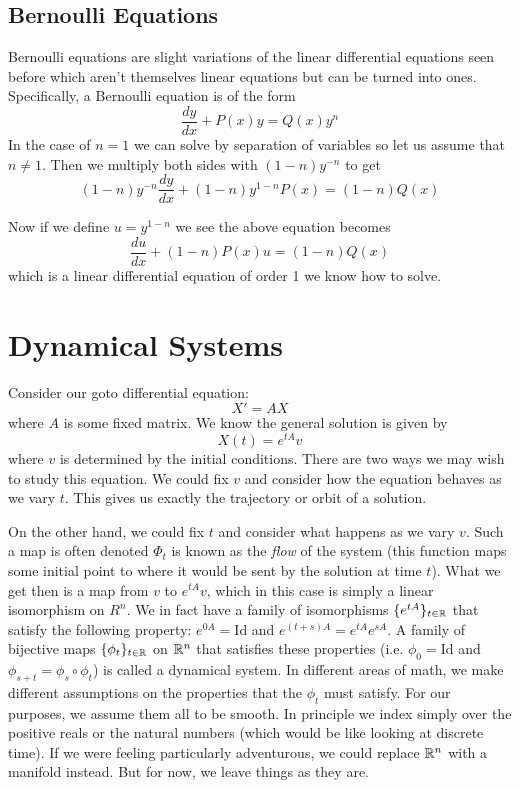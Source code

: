 \subsection{Bernoulli Equations}

Bernoulli equations are slight variations of the linear differential equations seen before which aren't themselves linear equations but can be turned into ones. Specifically, a Bernoulli equation is of the form
\begin{equation}\label{eq:bernoulli}
    \frac{dy}{dx} + P(x)y = Q(x) y^n
\end{equation}
In the case of $n = 1$ we can solve by separation of variables so let us assume that $n \neq 1$. Then we multiply both sides with $(1 - n)y^{-n}$ to get 
$$ (1 - n)y^{-n} \frac{dy}{dx} + (1 - n)y^{1 - n}P(x) = (1 - n)Q(x) $$

Now if we define $u = y^{1 - n}$ we see the above equation becomes
$$ \frac{du}{dx} + (1 - n)P(x) u = (1 - n)Q(x) $$
which is a linear differential equation of order 1 we know how to solve.

\section{Dynamical Systems}\label{sec:dyn-systems}
Consider our goto differential equation:
$$ X' = AX $$
where $A$ is some fixed matrix. We know the general solution is given by $$ X(t) = e^{tA}v $$ where $v$ is determined by the initial conditions. There are two ways we may wish to study this equation. We could fix $v$ and consider how the equation behaves as we vary $t$. This gives us exactly the trajectory or orbit of a solution.

On the other hand, we could fix $t$ and consider what happens as we vary $v$. Such a map is often denoted $\Phi_t$ is known as the \textit{flow} of the system (this function maps some initial point to where it would be sent by the solution at time $t$). What we get then is a map from $v$ to $e^{tA}v$, which in this case is simply a linear isomorphism on $R^n$. We in fact have a family of isomorphisms $\{e^{tA}\}_{t \in \mathbb{R}}$ that satisfy the following property: $e^{0A} = \text{Id}$ and $e^{(t + s)A} = e^{tA} e^{sA}$. A family of bijective maps $\{\phi_t\}_{t \in \mathbb{R}}$ on $\mathbb{R}^n$ that satisfies these properties (i.e. $\phi_0 = \text{Id}$ and $\phi_{s + t} = \phi_s \circ \phi_t$) is called a dynamical system. In different areas of math, we make different assumptions on the properties that the $\phi_t$ must satisfy. For our purposes, we assume them all to be smooth. In principle we index simply over the positive reals or the natural numbers (which would be like looking at discrete time). If we were feeling particularly adventurous, we could replace $\mathbb{R}^n$ with a manifold instead. But for now, we leave things as they are.

